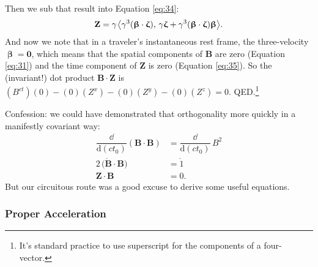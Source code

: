 \documentclass[12pt]{article}
\renewcommand{\vv}[1]{\mathbf{#1}}
\newcommand{\dd}[1]{\mathrm{d}#1}
\newcommand{\vvbeta}{\bm{\upbeta}}
\newcommand{\vvzeta}{\bm{\upzeta}}
\begin{document}
Then we sub that result into Equation \ref{eq:34}:
\begin{equation}\label{eq:35}
\vv Z =\gamma \mkern1.5mu \big \langle \gamma^3 (\vvbeta \cdot \vvzeta), \, \gamma \vvzeta + \gamma^3 (\vvbeta \cdot \vvzeta) \vvbeta \big \rangle.
\end{equation}
And now we note that in a traveler's instantaneous rest frame, the three-velocity $\vvbeta = \vv 0$, which means that the spatial components of $\vv B$ are zero (Equation \ref{eq:31}) and the time component of $\vv Z$ is zero (Equation \ref{eq:35}). So the (invariant!) dot product $\vv B \cdot \vv Z$ is $(B^{ct})(0) - (0)(Z^x) - (0)(Z^y) - (0)(Z^z) = 0$. QED.\footnote{It's standard practice to use superscript for the components of a four-vector.}

Confession: we could have demonstrated that orthogonality more quickly in a manifestly covariant way:
\begin{equation*}
\begin{split}
\dfrac{\dd}{\dd (ct_0)} \left( \vv B \cdot \vv B \right) &= \dfrac{\dd}{\dd (c t_0)} \, B^2 \\[2pt]
2 \, \big( \mathring{\vv B} \cdot \vv B \big) &= \mathring{1} \\[3pt]
\vv Z \cdot \vv B &= 0 .
\end{split}
\end{equation*}
But our circuitous route was a good excuse to derive some useful equations.


\subsubsection{Proper Acceleration}\label{sssec:pa}
\end{document}
